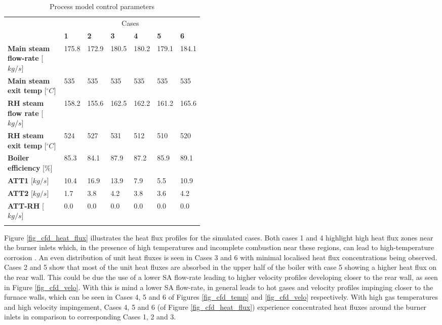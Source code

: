 \documentclass[review]{elsarticle}
\begin{document}
\begin{table}[h!]
\centering
\caption{Process model control parameters}
\vspace{2mm}
{\tabulinesep=1.2mm
\begin{tabularx}{\linewidth}{p{0.45\linewidth} XXXXXX}
\hline
&\multicolumn{6}{c}{Cases}\\
 & \textbf{1} & \textbf{2} & \textbf{3}& \textbf{4}&\textbf{5}&\textbf{6}\\
\hline
\textbf{Main steam flow-rate} 	[$kg/s$]		&175.8&172.9&180.5&180.2&179.1&184.1 \\
\textbf{Main steam exit temp} 	[$^{\circ}C$]	&535& 535 &535&535 &535& 535\\
\textbf{RH steam flow rate} 	[$kg/s$]		&158.2&155.6&162.5&162.2&161.2&165.6\\
\textbf{RH steam exit temp} 	[$^{\circ}C$]	&524&527&531&512&510&520\\
\textbf{Boiler efficiency} 		[$\%$]			&85.3&84.1&87.9	&87.2&85.9&89.1\\
\textbf{ATT1} 		[$kg/s$]					&10.4&16.9&13.9&7.9&5.5&10.9\\
\textbf{ATT2} 		[$kg/s$]					&1.7&3.8&4.2&3.8&3.6&4.2\\
\textbf{ATT-RH} 		[$kg/s$]				&0.0&0.0&0.0&0.0&0.0&0.0\\
\hline
\label{tbl_process_parameters}
\end{tabularx}}
\end{table}

Figure \ref{fig_cfd_heat_flux} illustrates the heat flux profiles for the simulated cases. Both cases 1 and 4 highlight high heat flux zones near the burner inlets which, in the presence of high temperatures and incomplete combustion near these regions, can lead to high-temperature corrosion \cite{Du2017}. An even distribution of unit heat fluxes is seen in Cases 3 and 6 with minimal localised heat flux concentrations being observed. Cases 2 and 5 show that most of the unit heat fluxes are absorbed in the upper half of the boiler with case 5 showing a higher heat flux on the rear wall. This could be due the use of a lower SA flow-rate leading to higher velocity profiles developing closer to the rear wall, as seen in Figure \ref{fig_cfd_velo}. With this is mind a lower SA flow-rate, in general leads to hot gases and velocity profiles impinging closer to the furnace walls, which can be seen in Cases 4, 5 and 6 of Figures \ref{fig_cfd_temp} and \ref{fig_cfd_velo} respectively. With high gas temperatures and high velocity impingement, Cases 4, 5 and 6 (of Figure \ref{fig_cfd_heat_flux}) experience concentrated heat fluxes around the burner inlets in comparison to corresponding Cases 1, 2 and 3.
\end{document}
